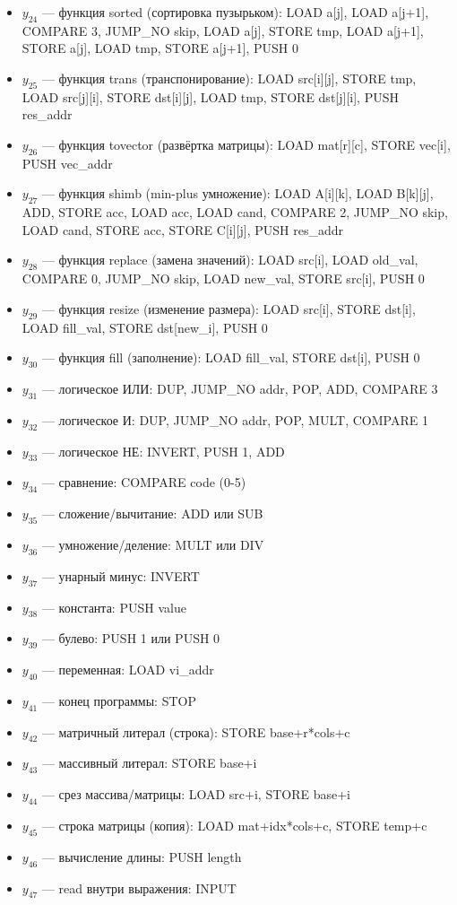 \documentclass[a4paper,final]{article}
\begin{document}
\begin{itemize}
    \item $y_{24}$ --- функция sorted (сортировка пузырьком): LOAD a[j], LOAD a[j+1], COMPARE 3, JUMP\_NO skip, LOAD a[j], STORE tmp, LOAD a[j+1], STORE a[j], LOAD tmp, STORE a[j+1], PUSH 0
    \item $y_{25}$ --- функция trans (транспонирование): LOAD src[i][j], STORE tmp, LOAD src[j][i], STORE dst[i][j], LOAD tmp, STORE dst[j][i], PUSH res\_addr
    \item $y_{26}$ --- функция tovector (развёртка матрицы): LOAD mat[r][c], STORE vec[i], PUSH vec\_addr
    \item $y_{27}$ --- функция shimb (min-plus умножение): LOAD A[i][k], LOAD B[k][j], ADD, STORE acc, LOAD acc, LOAD cand, COMPARE 2, JUMP\_NO skip, LOAD cand, STORE acc, STORE C[i][j], PUSH res\_addr
    \item $y_{28}$ --- функция replace (замена значений): LOAD src[i], LOAD old\_val, COMPARE 0, JUMP\_NO skip, LOAD new\_val, STORE src[i], PUSH 0
    \item $y_{29}$ --- функция resize (изменение размера): LOAD src[i], STORE dst[i], LOAD fill\_val, STORE dst[new\_i], PUSH 0
    \item $y_{30}$ --- функция fill (заполнение): LOAD fill\_val, STORE dst[i], PUSH 0
    \item $y_{31}$ --- логическое ИЛИ: DUP, JUMP\_NO addr, POP, ADD, COMPARE 3
    \item $y_{32}$ --- логическое И: DUP, JUMP\_NO addr, POP, MULT, COMPARE 1
    \item $y_{33}$ --- логическое НЕ: INVERT, PUSH 1, ADD
    \item $y_{34}$ --- сравнение: COMPARE code (0-5)
    \item $y_{35}$ --- сложение/вычитание: ADD или SUB
    \item $y_{36}$ --- умножение/деление: MULT или DIV
    \item $y_{37}$ --- унарный минус: INVERT
    \item $y_{38}$ --- константа: PUSH value
    \item $y_{39}$ --- булево: PUSH 1 или PUSH 0
    \item $y_{40}$ --- переменная: LOAD vi\_addr
    \item $y_{41}$ --- конец программы: STOP
    \item $y_{42}$ --- матричный литерал (строка): STORE base+r*cols+c
    \item $y_{43}$ --- массивный литерал: STORE base+i
    \item $y_{44}$ --- срез массива/матрицы: LOAD src+i, STORE base+i
    \item $y_{45}$ --- строка матрицы (копия): LOAD mat+idx*cols+c, STORE temp+c
    \item $y_{46}$ --- вычисление длины: PUSH length
    \item $y_{47}$ --- read внутри выражения: INPUT
\end{itemize}
\end{document}
